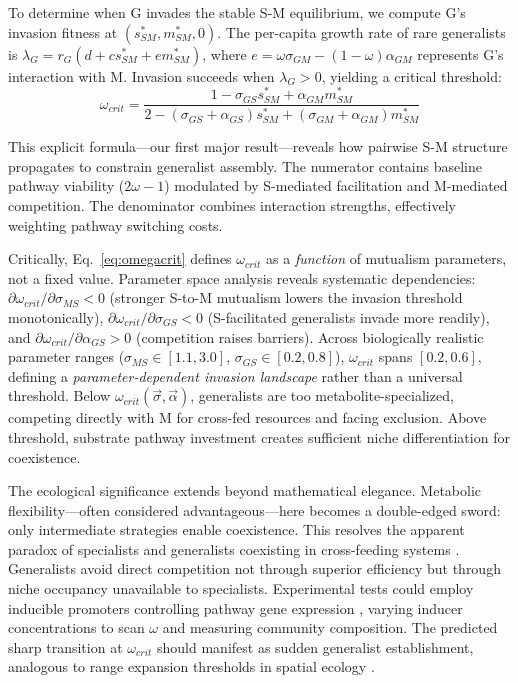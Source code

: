 \documentclass[9pt,twocolumn]{pnas-new}
\begin{document}
To determine when G invades the stable S-M equilibrium, we compute G's invasion fitness at $(s^*_{SM}, m^*_{SM}, 0)$. The per-capita growth rate of rare generalists is $\lambda_G = r_G(d + c s^*_{SM} + e m^*_{SM})$, where $e = \omega\sigma_{GM} - (1-\omega)\alpha_{GM}$ represents G's interaction with M. Invasion succeeds when $\lambda_G > 0$, yielding a critical threshold:
\begin{equation}
\omega_{crit} = \frac{1 - \sigma_{GS} s^*_{SM} + \alpha_{GM} m^*_{SM}}{2 - (\sigma_{GS}+\alpha_{GS}) s^*_{SM} + (\sigma_{GM}+\alpha_{GM}) m^*_{SM}} \label{eq:omegacrit}
\end{equation}

This explicit formula—our first major result—reveals how pairwise S-M structure propagates to constrain generalist assembly. The numerator contains baseline pathway viability ($2\omega - 1$) modulated by S-mediated facilitation and M-mediated competition. The denominator combines interaction strengths, effectively weighting pathway switching costs.

Critically, Eq.~\ref{eq:omegacrit} defines $\omega_{crit}$ as a \textit{function} of mutualism parameters, not a fixed value. Parameter space analysis reveals systematic dependencies: $\partial\omega_{crit}/\partial\sigma_{MS} < 0$ (stronger S-to-M mutualism lowers the invasion threshold monotonically), $\partial\omega_{crit}/\partial\sigma_{GS} < 0$ (S-facilitated generalists invade more readily), and $\partial\omega_{crit}/\partial\alpha_{GS} > 0$ (competition raises barriers). Across biologically realistic parameter ranges ($\sigma_{MS} \in [1.1, 3.0]$, $\sigma_{GS} \in [0.2, 0.8]$), $\omega_{crit}$ spans $[0.2, 0.6]$, defining a \textit{parameter-dependent invasion landscape} rather than a universal threshold. Below $\omega_{crit}(\vec{\sigma}, \vec{\alpha})$, generalists are too metabolite-specialized, competing directly with M for cross-fed resources and facing exclusion. Above threshold, substrate pathway investment creates sufficient niche differentiation for coexistence.

The ecological significance extends beyond mathematical elegance. Metabolic flexibility—often considered advantageous—here becomes a double-edged sword: only intermediate strategies enable coexistence. This resolves the apparent paradox of specialists and generalists coexisting in cross-feeding systems \cite{rosenfeld2020defining,goldford2018emergent}. Generalists avoid direct competition not through superior efficiency but through niche occupancy unavailable to specialists. Experimental tests could employ inducible promoters controlling pathway gene expression \cite{guantes2006multistable}, varying inducer concentrations to scan $\omega$ and measuring community composition. The predicted sharp transition at $\omega_{crit}$ should manifest as sudden generalist establishment, analogous to range expansion thresholds in spatial ecology \cite{hallatschek2007genetic}.
\end{document}
